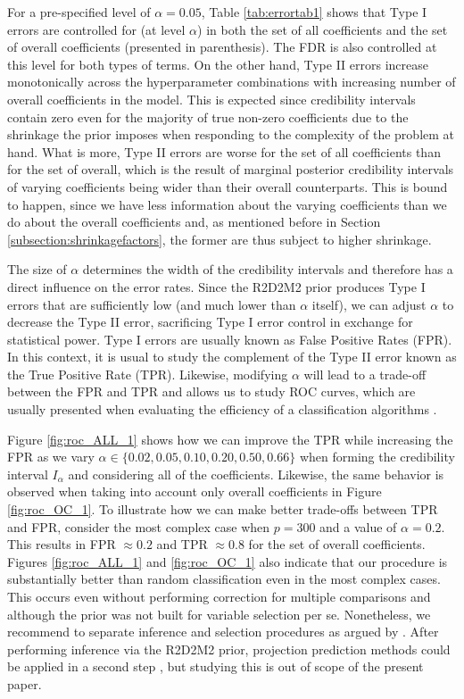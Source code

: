 For a pre-specified level of $\alpha=0.05$, Table \ref{tab:errortab1} shows that Type I errors are controlled for (at level $\alpha$) in both the set of all coefficients and the set of overall coefficients (presented in parenthesis). The FDR is also controlled at this level for both types of terms. On the other hand, Type II errors increase monotonically across the hyperparameter combinations with increasing number of overall coefficients in the model. This is expected since credibility intervals contain zero even for the majority of true non-zero coefficients due to the shrinkage the prior imposes when responding to the complexity of the problem at hand. What is more, Type II errors are worse for the set of all coefficients than for the set of overall, which is the result of marginal posterior credibility intervals of varying coefficients being wider than their overall counterparts. This is bound to happen, since we have less information about the varying coefficients than we do about the overall coefficients and, as mentioned before in Section \ref{subsection:shrinkagefactors}, the former are thus subject to higher shrinkage.

The size of $\alpha$ determines the width of the credibility intervals and therefore has a direct influence on the error rates. Since the R2D2M2 prior produces Type I errors that are sufficiently low (and much lower than $\alpha$ itself), we can adjust $\alpha$ to decrease the Type II error, sacrificing Type I error control in exchange for statistical power. Type I errors are usually known as False Positive Rates (FPR). In this context, it is usual to study the complement of the Type II error known as the True Positive Rate (TPR). Likewise, modifying $\alpha$ will lead to a trade-off between the FPR and TPR and allows us to study ROC curves, which are usually presented when evaluating the efficiency of a classification algorithms \citep{roccurves}.

Figure \ref{fig:roc_ALL_1} shows how we can improve the TPR while increasing the FPR as we vary $\alpha \in \{ 0.02, 0.05, 0.10,0.20,0.50, 0.66 \}$ when forming the credibility interval $I_\alpha$ and considering all of the coefficients. Likewise, the same behavior is observed when taking into account only overall coefficients in Figure \ref{fig:roc_OC_1}. To illustrate how we can make better trade-offs between TPR and FPR, consider the most complex case when $p=300$ and a value of  $\alpha = 0.2$. This results in FPR $\approx 0.2$ and TPR $\approx 0.8$ for the set of overall coefficients. Figures \ref{fig:roc_ALL_1} and \ref{fig:roc_OC_1} also indicate that our procedure is substantially better than random classification even in the most complex cases. This occurs even without performing correction for multiple comparisons and although the prior was not built for variable selection per se. Nonetheless, we recommend to separate inference and selection procedures as argued by \cite{PiironenProjInf}. After performing inference via the R2D2M2 prior, projection prediction methods could be applied in a second step \cite{PiironenProjInf, catalina2020projection}, but studying this is out of scope of the present paper.


